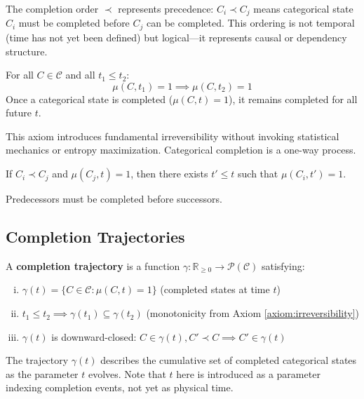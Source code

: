 The completion order $\prec$ represents precedence: $C_i \prec C_j$ means categorical state $C_i$ must be completed before $C_j$ can be completed. This ordering is not temporal (time has not yet been defined) but logical—it represents causal or dependency structure.

\begin{axiom}
\label{axiom:irreversibility}
For all $C \in \mathcal{C}$ and all $t_1 \leq t_2$:
\begin{equation}
\mu(C, t_1) = 1 \implies \mu(C, t_2) = 1
\end{equation}
Once a categorical state is completed ($\mu(C, t) = 1$), it remains completed for all future $t$.
\end{axiom}

This axiom introduces fundamental irreversibility without invoking statistical mechanics or entropy maximization. Categorical completion is a one-way process.

\begin{axiom}
\label{axiom:order_compatibility}
If $C_i \prec C_j$ and $\mu(C_j, t) = 1$, then there exists $t' \leq t$ such that $\mu(C_i, t') = 1$.

Predecessors must be completed before successors.
\end{axiom}

\subsection{Completion Trajectories}

\begin{definition}
\label{def:completion_trajectory}
A \textbf{completion trajectory} is a function $\gamma: \mathbb{R}_{\geq 0} \to \mathcal{P}(\mathcal{C})$ satisfying:
\begin{enumerate}[(i)]
\item $\gamma(t) = \{C \in \mathcal{C} : \mu(C, t) = 1\}$ (completed states at time $t$)
\item $t_1 \leq t_2 \implies \gamma(t_1) \subseteq \gamma(t_2)$ (monotonicity from Axiom \ref{axiom:irreversibility})
\item $\gamma(t)$ is downward-closed: $C \in \gamma(t), C' \prec C \implies C' \in \gamma(t)$
\end{enumerate}
\end{definition}

The trajectory $\gamma(t)$ describes the cumulative set of completed categorical states as the parameter $t$ evolves. Note that $t$ here is introduced as a parameter indexing completion events, not yet as physical time.

